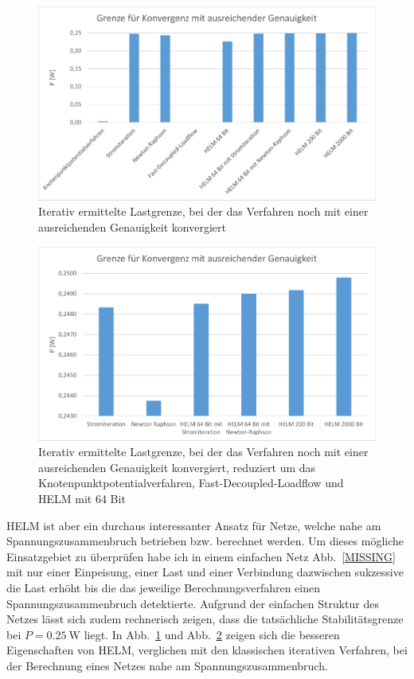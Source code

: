 \documentclass[12pt,a4paper]{article}
\newcommand{\reffig}[1]{{Abb.~\ref{#1}}}
\begin{document}
	\begin{figure}
		\centering
		\includegraphics[scale=0.8]{pictures/convergence_border_1}
		\caption{Iterativ ermittelte Lastgrenze, bei der das Verfahren noch mit einer ausreichenden Genauigkeit konvergiert}
		\label{fig:convergence_border_1}
	\end{figure}
	
	\begin{figure}
		\centering
		\includegraphics[scale=0.8]{pictures/convergence_border_2}
		\caption{Iterativ ermittelte Lastgrenze, bei der das Verfahren noch mit einer ausreichenden Genauigkeit konvergiert, reduziert um das Knotenpunktpotentialverfahren, Fast-Decoupled-Loadflow und HELM mit 64 Bit}
		\label{fig:convergence_border_2}
	\end{figure}
	
	HELM ist aber ein durchaus interessanter Ansatz für Netze, welche nahe am Spannungszusammenbruch betrieben bzw. berechnet werden. Um dieses mögliche Einsatzgebiet zu überprüfen habe ich in einem einfachen Netz \reffig{MISSING} mit nur einer Einpeisung, einer Last und einer Verbindung dazwischen sukzessive die Last erhöht bis die das jeweilige Berechnungsverfahren einen Spannungszusammenbruch detektierte. Aufgrund der einfachen Struktur des Netzes lässt sich zudem rechnerisch zeigen, dass die tatsächliche Stabilitätsgrenze bei $P = \SI{0.25}{\watt}$ liegt. In \reffig{fig:convergence_border_1} und \reffig{fig:convergence_border_2} zeigen sich die besseren Eigenschaften von HELM, verglichen mit den klassischen iterativen Verfahren, bei der Berechnung eines Netzes nahe am Spannungszusammenbruch.
	
\end{document}
